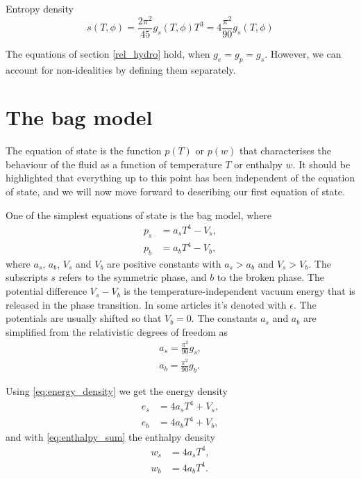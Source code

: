 Entropy density
\cite[eq. S12]{borsanyi_lattice_2016}
\begin{equation}
s(T,\phi) = \frac{2\pi^2}{45} g_s(T,\phi) T^3 = 4 \frac{\pi^2}{90} g_s(T,\phi)
\end{equation}

The equations of section \ref{rel_hydro} hold, when $g_e = g_p = g_s$.
However, we can account for non-idealities by defining them separately.


\section{The bag model}
\label{bag_model}
The equation of state is the function $p(T)$ or $p(w)$ that characterises the behaviour of the fluid as a function of temperature $T$ or enthalpy $w$.
It should be highlighted that everything up to this point has been independent of the equation of state,
and we will now move forward to describing our first equation of state.

One of the simplest equations of state is the bag model, where
\cites[eq. 7.33]{lecture_notes}[eq. 8-9]{giese_2020}
\begin{align}
p_s &= a_s T^4 - V_s,
\label{eq:bag_ps} \\
p_b &= a_b T^4 - V_b,
\label{eq:bag_pb}
\end{align}
where $a_s$, $a_b$, $V_s$ and $V_b$ are positive constants with $a_s > a_b$ and $V_s > V_b$.
The subscripts $s$ refers to the symmetric phase, and $b$ to the broken phase.
The potential difference $V_s - V_b$ is the temperature-independent vacuum energy that is released in the phase transition.
In some articles it's denoted with $\epsilon$.
The potentials are usually shifted so that $V_b = 0$.
The constants $a_s$ and $a_b$ are simplified from the relativistic degrees of freedom as
\begin{align}
a_s = \frac{\pi^2}{90} g_s, \\
a_b = \frac{\pi^2}{90} g_b.
\end{align}

Using \eqref{eq:energy_density} we get the energy density
\begin{align}
e_s &= 4 a_s T^4 + V_s, \\
e_b &= 4 a_b T^4 + V_b,
\end{align}
and with \eqref{eq:enthalpy_sum} the enthalpy density
\begin{align}
w_s &= 4 a_s T^4, \\
w_b &= 4 a_b T^4.
\end{align}

